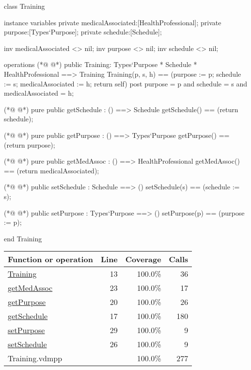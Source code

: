 \begin{vdmpp}[breaklines=true]
class Training
 
instance variables
 private medicalAssociated:[HealthProfessional];
 private purpose:[Types`Purpose];
 private schedule:[Schedule];

 inv medicalAssociated <> nil;
 inv purpose <> nil;
 inv schedule <> nil;

operations
(*@
\label{Training:13}
@*)
 public Training: Types`Purpose * Schedule * HealthProfessional ==> Training
   Training(p, s, h) == (purpose := p; schedule := s; medicalAssociated := h; return self)
 post purpose = p and schedule = s and medicalAssociated = h;

(*@
\label{getSchedule:17}
@*)
 pure public getSchedule : () ==> Schedule
   getSchedule() == (return schedule);
 
(*@
\label{getPurpose:20}
@*)
  pure public getPurpose : () ==> Types`Purpose
  getPurpose() == (return purpose); 
 
(*@
\label{getMedAssoc:23}
@*)
 pure public getMedAssoc : () ==> HealthProfessional
  getMedAssoc() == (return medicalAssociated); 

(*@
\label{setSchedule:26}
@*)
 public setSchedule : Schedule ==> ()
   setSchedule(s) == (schedule := s);
 
(*@
\label{setPurpose:29}
@*)
 public setPurpose : Types`Purpose ==> ()
   setPurpose(p) == (purpose := p);
 
 end Training
\end{vdmpp}
\bigskip
\begin{longtable}{|l|r|r|r|}
\hline
Function or operation & Line & Coverage & Calls \\
\hline
\hline
\hyperref[Training:13]{Training} & 13&100.0\% & 36 \\
\hline
\hyperref[getMedAssoc:23]{getMedAssoc} & 23&100.0\% & 17 \\
\hline
\hyperref[getPurpose:20]{getPurpose} & 20&100.0\% & 26 \\
\hline
\hyperref[getSchedule:17]{getSchedule} & 17&100.0\% & 180 \\
\hline
\hyperref[setPurpose:29]{setPurpose} & 29&100.0\% & 9 \\
\hline
\hyperref[setSchedule:26]{setSchedule} & 26&100.0\% & 9 \\
\hline
\hline
Training.vdmpp & & 100.0\% & 277 \\
\hline
\end{longtable}

